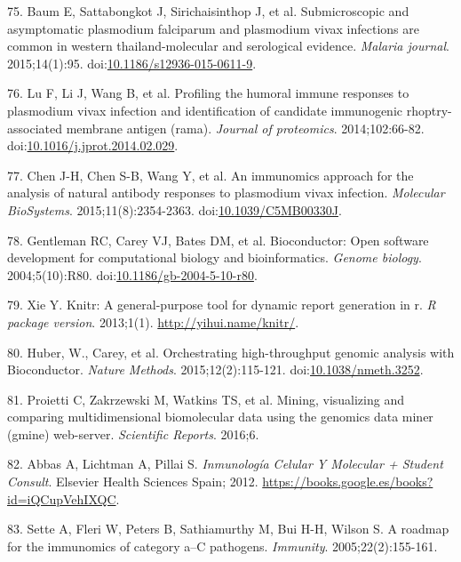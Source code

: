 \documentclass[]{article}
\begin{document}
\hypertarget{ref-baum2015}{}
75. Baum E, Sattabongkot J, Sirichaisinthop J, et al. Submicroscopic and
asymptomatic plasmodium falciparum and plasmodium vivax infections are
common in western thailand-molecular and serological evidence.
\emph{Malaria journal}. 2015;14(1):95.
doi:\href{https://doi.org/10.1186/s12936-015-0611-9}{10.1186/s12936-015-0611-9}.

\hypertarget{ref-lu2014rama}{}
76. Lu F, Li J, Wang B, et al. Profiling the humoral immune responses to
plasmodium vivax infection and identification of candidate immunogenic
rhoptry-associated membrane antigen (rama). \emph{Journal of
proteomics}. 2014;102:66-82.
doi:\href{https://doi.org/10.1016/j.jprot.2014.02.029}{10.1016/j.jprot.2014.02.029}.

\hypertarget{ref-chen2015immunomics}{}
77. Chen J-H, Chen S-B, Wang Y, et al. An immunomics approach for the
analysis of natural antibody responses to plasmodium vivax infection.
\emph{Molecular BioSystems}. 2015;11(8):2354-2363.
doi:\href{https://doi.org/10.1039/C5MB00330J}{10.1039/C5MB00330J}.

\hypertarget{ref-bioconductor2004}{}
78. Gentleman RC, Carey VJ, Bates DM, et al. Bioconductor: Open software
development for computational biology and bioinformatics. \emph{Genome
biology}. 2004;5(10):R80.
doi:\href{https://doi.org/10.1186/gb-2004-5-10-r80}{10.1186/gb-2004-5-10-r80}.

\hypertarget{ref-knitr}{}
79. Xie Y. Knitr: A general-purpose tool for dynamic report generation
in r. \emph{R package version}. 2013;1(1).
\url{http://yihui.name/knitr/}.

\hypertarget{ref-Biobase}{}
80. Huber, W., Carey, et al. Orchestrating high-throughput genomic
analysis with Bioconductor. \emph{Nature Methods}. 2015;12(2):115-121.
doi:\href{https://doi.org/10.1038/nmeth.3252}{10.1038/nmeth.3252}.

\hypertarget{ref-gmine2016}{}
81. Proietti C, Zakrzewski M, Watkins TS, et al. Mining, visualizing and
comparing multidimensional biomolecular data using the genomics data
miner (gmine) web-server. \emph{Scientific Reports}. 2016;6.

\hypertarget{ref-abbas2012}{}
82. Abbas A, Lichtman A, Pillai S. \emph{Inmunología Celular Y Molecular
+ Student Consult}. Elsevier Health Sciences Spain; 2012.
\url{https://books.google.es/books?id=iQCupVehIXQC}.

\hypertarget{ref-sette2005}{}
83. Sette A, Fleri W, Peters B, Sathiamurthy M, Bui H-H, Wilson S. A
roadmap for the immunomics of category a--C pathogens. \emph{Immunity}.
2005;22(2):155-161.
\end{document}
